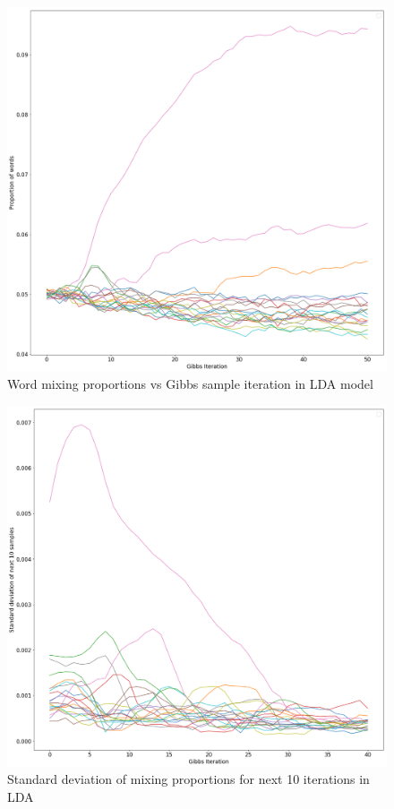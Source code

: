 \documentclass[twoside,twocolumn]{article}
\begin{document}
\begin{figure}[h]
  \centering
    \includegraphics[width=\linewidth]{e_1}
  \caption{Word mixing proportions vs Gibbs sample iteration in LDA model}
  \label{fig:e_1}
\end{figure}

\begin{figure}[h]
  \centering
    \includegraphics[width=\linewidth]{e_2}
  \caption{Standard deviation of mixing proportions for next 10 iterations in LDA}
  \label{fig:e_2}
\end{figure}
\end{document}
